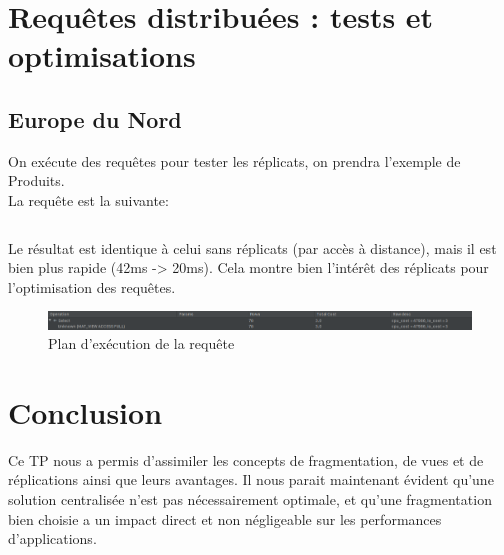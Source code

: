 \documentclass[10pt,a4paper]{article}
\theoremstyle{plain}
\begin{document}
\section{Requêtes distribuées : tests et optimisations}
\subsection{Europe du Nord}

On exécute des requêtes pour tester les réplicats, on prendra l'exemple de Produits.\\La requête est la suivante:

\inputminted{sql}{INSA-DB12-EuropeNord-replicats-tests.sql}

Le résultat est identique à celui sans réplicats (par accès à distance), mais il est bien plus rapide (42ms -> 20ms). Cela montre bien l'intérêt des réplicats pour l'optimisation des requêtes.

\begin{figure}[H]
    \centering
    \includegraphics[width=15cm]{INSA-DB12-EuropeNord-plan-exec-vues-replicat-produits.png}
    \caption{Plan d'exécution de la requête}
\end{figure}

\section{Conclusion}

Ce TP nous a permis d'assimiler les concepts de fragmentation, de vues et de réplications ainsi que leurs avantages. Il nous parait maintenant évident qu'une solution centralisée n'est pas nécessairement optimale, et qu'une fragmentation bien choisie a un impact direct et non négligeable sur les performances d'applications.
\end{document}
